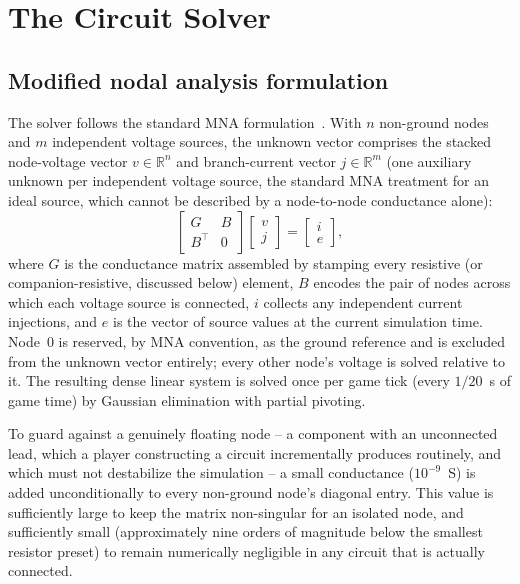 \section{The Circuit Solver}
\label{sec:circuit-solver}

\subsection{Modified nodal analysis formulation}

The solver follows the standard MNA formulation~\cite{ho1975mna}. With $n$ non-ground nodes
and $m$ independent voltage sources, the unknown vector comprises the stacked node-voltage
vector $v \in \mathbb{R}^n$ and branch-current vector $j \in \mathbb{R}^m$ (one auxiliary
unknown per independent voltage source, the standard MNA treatment for an ideal source,
which cannot be described by a node-to-node conductance alone):
\begin{equation}
\begin{bmatrix} G & B \\ B^{\top} & 0 \end{bmatrix}
\begin{bmatrix} v \\ j \end{bmatrix}
=
\begin{bmatrix} i \\ e \end{bmatrix},
\end{equation}
where $G$ is the conductance matrix assembled by stamping every resistive (or
companion-resistive, discussed below) element, $B$ encodes the pair of nodes across which
each voltage source is connected, $i$ collects any independent current injections, and $e$
is the vector of source values at the current simulation time. Node~0 is reserved, by MNA
convention, as the ground reference and is excluded from the unknown vector entirely; every
other node's voltage is solved relative to it. The resulting dense linear system is solved
once per game tick (every $1/20$~s of game time) by Gaussian elimination with partial
pivoting.

To guard against a genuinely floating node -- a component with an unconnected lead, which a
player constructing a circuit incrementally produces routinely, and which must not
destabilize the simulation -- a small conductance ($10^{-9}$~S) is added unconditionally to
every non-ground node's diagonal entry. This value is sufficiently large to keep the matrix
non-singular for an isolated node, and sufficiently small (approximately nine orders of
magnitude below the smallest resistor preset) to remain numerically negligible in any
circuit that is actually connected.

